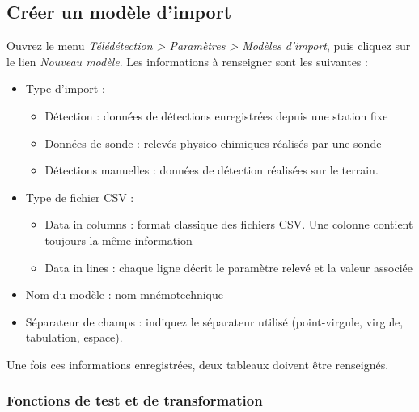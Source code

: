 \subsection{Créer un modèle d'import}

Ouvrez le menu \textit{Télédétection > Paramètres > Modèles d'import}, puis cliquez sur le lien \textit{Nouveau modèle}. Les informations à renseigner sont les suivantes :
\begin{itemize}
	\item Type d'import : 
	\begin{itemize}
		\item Détection : données de détections enregistrées depuis une station fixe
		\item Données de sonde : relevés physico-chimiques réalisés par une sonde
		\item Détections manuelles : données de détection réalisées sur le terrain.
	\end{itemize}
	\item Type de fichier CSV :
	\begin{itemize}
		\item Data in columns : format classique des fichiers CSV. Une colonne contient toujours la même information
		\item Data in lines : chaque ligne décrit le paramètre relevé et la valeur associée
	\end{itemize}
	\item  Nom du modèle : nom mnémotechnique
	\item Séparateur de champs : indiquez le séparateur utilisé (point-virgule, virgule, tabulation, espace).
\end{itemize}

Une fois ces informations enregistrées, deux tableaux doivent être renseignés.

\subsubsection{Fonctions de test et de transformation}


